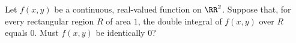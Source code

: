 Let $f(x,y)$ be a continuous, real-valued function on $\RR^2$. Suppose that, for every
rectangular region $R$ of area $1$, the double integral of $f(x,y)$ over $R$ equals $0$.
Must $f(x,y)$ be identically 0?
